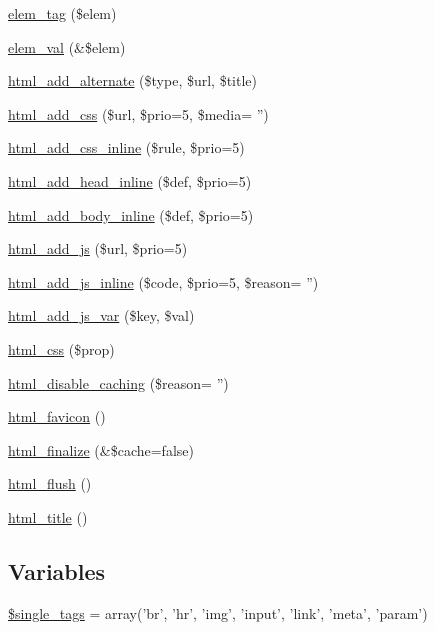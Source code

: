 \begin{DoxyCompactItemize}
\item 
\hyperlink{html_8inc_8php_a158c5e6dccf734bc8c035e6bcd0a446f}{elem\_\-tag} (\$elem)
\item 
\hyperlink{html_8inc_8php_ae28d850c3c906c6884462ca89c06f59b}{elem\_\-val} (\&\$elem)
\item 
\hyperlink{html_8inc_8php_ae013e8f0bdd681184ee1873a1964c454}{html\_\-add\_\-alternate} (\$type, \$url, \$title)
\item 
\hyperlink{html_8inc_8php_a962ef1b29e909a38b9a7b79086d54ab2}{html\_\-add\_\-css} (\$url, \$prio=5, \$media= '')
\item 
\hyperlink{html_8inc_8php_aae42f14c51b89215ad79b303ecb6e9e9}{html\_\-add\_\-css\_\-inline} (\$rule, \$prio=5)
\item 
\hyperlink{html_8inc_8php_a3c3f439a358951694d2280124bd6e2b9}{html\_\-add\_\-head\_\-inline} (\$def, \$prio=5)
\item 
\hyperlink{html_8inc_8php_a2f59375f9b3aac2cf9ab8968cca33e17}{html\_\-add\_\-body\_\-inline} (\$def, \$prio=5)
\item 
\hyperlink{html_8inc_8php_a450214704e1bbc2e8849abb54db38a03}{html\_\-add\_\-js} (\$url, \$prio=5)
\item 
\hyperlink{html_8inc_8php_a9b9c28bfb08c81ccc10a3064b6775dc0}{html\_\-add\_\-js\_\-inline} (\$code, \$prio=5, \$reason= '')
\item 
\hyperlink{html_8inc_8php_a84769b7fe7b5454ff46534d0577eb54c}{html\_\-add\_\-js\_\-var} (\$key, \$val)
\item 
\hyperlink{html_8inc_8php_ad52276fa2a03df7342ba4b8e6a334ce0}{html\_\-css} (\$prop)
\item 
\hyperlink{html_8inc_8php_ab0dafe79ee61164014b0a4d8b4112dbb}{html\_\-disable\_\-caching} (\$reason= '')
\item 
\hyperlink{html_8inc_8php_a5738adf9b56d1ff2b8d02977ed7929ce}{html\_\-favicon} ()
\item 
\hyperlink{html_8inc_8php_a405dc7e3718d4196c05087057ebf69bf}{html\_\-finalize} (\&\$cache=false)
\item 
\hyperlink{html_8inc_8php_af8cd696bd10c945b09dae962d549b75b}{html\_\-flush} ()
\item 
\hyperlink{html_8inc_8php_a3f572f51a815fe19c590fea7d6d3a1a6}{html\_\-title} ()
\end{DoxyCompactItemize}
\subsection*{Variables}
\begin{DoxyCompactItemize}
\item 
\hyperlink{html_8inc_8php_a0a733c7a281726a879f13e7325881887}{\$single\_\-tags} = array('br', 'hr', 'img', 'input', 'link', 'meta', 'param')
\end{DoxyCompactItemize}


